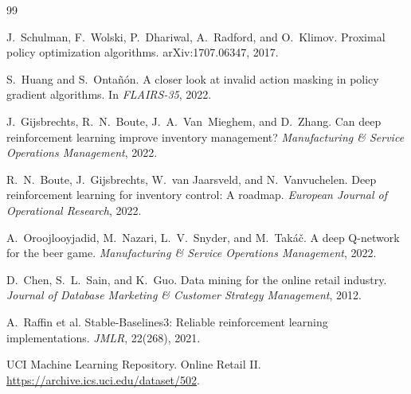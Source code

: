 \documentclass[10pt,twocolumn]{article}
\begin{document}
\begin{thebibliography}{99}\small
\setlength{\itemsep}{1pt}

 J.~Schulman, F.~Wolski, P.~Dhariwal, A.~Radford, and
O.~Klimov. Proximal policy optimization algorithms. arXiv:1707.06347, 2017.

 S.~Huang and S.~Ontañón. A closer look at invalid action
masking in policy gradient algorithms. In \emph{FLAIRS-35}, 2022.

 J.~Gijsbrechts, R.~N.~Boute, J.~A.~Van~Mieghem, and
D.~Zhang. Can deep reinforcement learning improve inventory management?
\emph{Manufacturing \& Service Operations Management}, 2022.

 R.~N.~Boute, J.~Gijsbrechts, W.~van Jaarsveld, and
N.~Vanvuchelen. Deep reinforcement learning for inventory control: A roadmap.
\emph{European Journal of Operational Research}, 2022.

 A.~Oroojlooyjadid, M.~Nazari, L.~V.~Snyder, and M.~Takáč.
A deep Q-network for the beer game. \emph{Manufacturing \& Service Operations
Management}, 2022.

 D.~Chen, S.~L.~Sain, and K.~Guo. Data mining for the online
retail industry. \emph{Journal of Database Marketing \& Customer Strategy
Management}, 2012.

 A.~Raffin et al. Stable-Baselines3: Reliable reinforcement
learning implementations. \emph{JMLR}, 22(268), 2021.

 UCI Machine Learning Repository. Online Retail II.
\url{https://archive.ics.uci.edu/dataset/502}.

\end{thebibliography}
\end{document}
